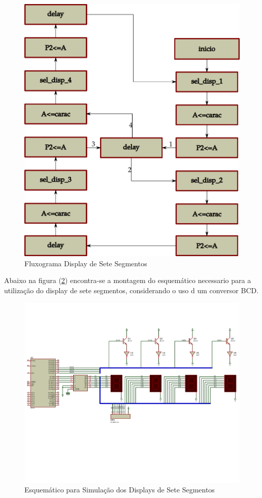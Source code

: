 \documentclass{Fabiano_file}
\begin{document}
{\begin{figure}[h!]
\centering
\includegraphics[width=.7\textwidth]{display_sete_segmetos_fluxpgrama.pdf}
\caption{Fluxograma Display de Sete Segmentos}
\label{fig:display_sete_segmetos_fluxpgrama}
\end{figure}

Abaixo na figura (\ref{fig:display_sete_segmentos}) encontra-se a montagem do esquemático necessario para a utilização do display de sete segmentos, considerando o uso d um conversor
BCD.

\pagebreak

\begin{figure}[h!]
\centering
\includegraphics[width=1\textwidth]{display_sete_segmentos.pdf}
\caption{Esquemático para Simulação dos Displays de Sete Segmentos}
\label{fig:display_sete_segmentos}
\end{figure}

}
\end{document}
